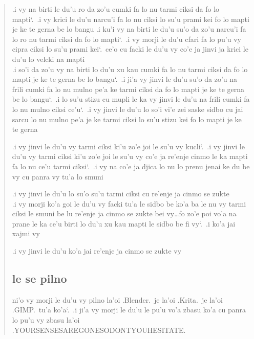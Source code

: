 \documentclass{report}
\newcommand\sds{\spacefactor\sfcode`.\ \space}
\begin{document}
\begin{quote}
	.i vy na birti le du'u ro da zo'u cumki fa lo nu tarmi ciksi da fo lo mapti\sds  .i vy krici le du'u narcu'i fa lo nu ciksi lo su'u prami kei fo lo mapti je ke te gerna be lo bangu
	.i ku'i vy na birti le du'u su'o da zo'u narcu'i fa lo ro nu tarmi ciksi da fo lo mapti\sds  .i vy morji le du'u cfari fa lo pu'u vy cipra ciksi lo su'u prami kei\sds ce'o cu facki le du'u vy co'e ja jinvi ja krici le du'u lo velcki na mapti\\
	.i so'i da zo'u vy na birti lo du'u xu kau cumki fa lo nu tarmi ciksi da fo lo mapti je ke te gerna be lo bangu\sds  .i ji'a vy jinvi le du'u su'o da zo'u na frili cumki fa lo nu mulno pe'a ke tarmi ciksi da fo lo mapti je ke te gerna be lo bangu\sds  .i lo su'u stizu cu mupli le ka vy jinvi le du'u na frili cumki fa lo nu mulno ciksi ce'u\sds  .i vy jinvi le du'u lo so'i vi'e zei saske sidbo cu jai sarcu lo nu mulno pe'a je ke tarmi ciksi lo su'u stizu kei fo lo mapti je ke te gerna

	.i vy jinvi le du'u vy tarmi ciksi ki'u zo'e joi le su'u vy kucli\sds  .i vy jinvi le du'u vy tarmi ciksi ki'u zo'e joi le su'u vy co'e ja re'enje cinmo le ka mapti fa lo nu ce'u tarmi ciksi\sds  .i vy na co'e ja djica lo nu lo prenu jenai ke du be vy cu panra vy tu'a lo smuni

	.i vy jinvi le du'u lo su'o su'u tarmi ciksi cu re'enje ja cinmo se zukte\\
	.i vy morji ko'a goi le du'u vy facki tu'a le sidbo be ko'a ba le nu vy tarmi ciksi le smuni be lu re'enje ja cinmo se zukte bei vy\ldots fo zo'e poi vo'a na prane le ka ce'u birti lo du'u xu kau mapti le sidbo be fi vy\sds  .i ko'a jai xajmi vy

	.i vy jinvi le du'u ko'a jai re'enje ja cinmo se zukte vy

	\subsection{le se pilno}
	ni'o vy morji le du'u vy pilno la'oi .Blender.\ je la'oi .Krita.\ je la'oi .GIMP.\ tu'a ko'a\sds  .i ji'a vy morji le du'u le pu'u vo'a zbasu ko'a cu panra lo pu'u vy zbasu la'oi .YOURSENSESAREGONESODONTYOUHESITATE.


\end{quote}
\end{document}
